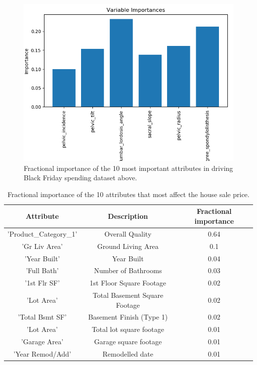 \documentclass[10pt]{article}
\begin{document}
\begin{figure}
\begin{center}
\includegraphics[scale=0.8,angle=0,trim=0cm 0cm 0cm 2cm]{importances_0_0.png}
\caption{Fractional importance of the 10 most important attributes in driving Black Friday spending dataset above.}
\label{fig_import}
\end{center}
\end{figure} 






\begin{table}
\center
\caption{Fractional importance of the 10 attributes that most affect the house sale price.}
\begin{tabular}{ccc}
\hline
Attribute & Description & Fractional importance \\
\hline 
\hline
'Product_Category_1' & Overall Quality & 0.64 \\
'Gr Liv Area' & Ground Living Area & 0.1 \\
'Year Built' & Year Built & 0.04 \\
'Full Bath' & Number of Bathrooms & 0.03 \\
'1st Flr SF' & 1st Floor Square Footage & 0.02 \\
'Lot Area' & Total Basement Square Footage & 0.02 \\
'Total Bsmt SF' & Basement Finish (Type 1) & 0.02 \\
'Lot Area' & Total lot square footage & 0.01 \\
'Garage Area' & Garage square footage & 0.01 \\
'Year Remod/Add' & Remodelled date & 0.01 \\
\hline
\end{tabular}
\label{tab_import}
\end{table}
\end{document}
